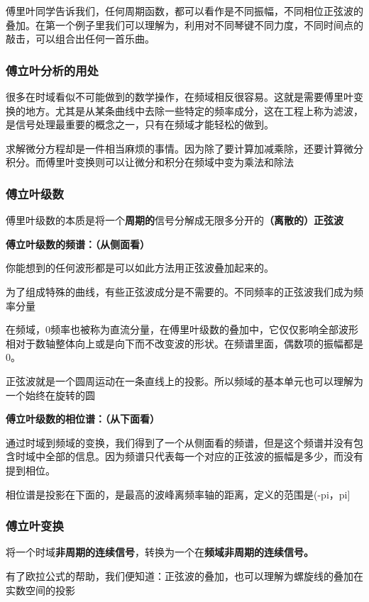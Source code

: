 \documentclass[UTF8]{ctexart}
\begin{document}
傅里叶同学告诉我们，任何周期函数，都可以看作是不同振幅，不同相位正弦波的叠加。在第一个例子里我们可以理解为，利用对不同琴键不同力度，不同时间点的敲击，可以组合出任何一首乐曲。

\subsubsection*{傅立叶分析的用处}

很多在时域看似不可能做到的数学操作，在频域相反很容易。这就是需要傅里叶变换的地方。尤其是从某条曲线中去除一些特定的频率成分，这在工程上称为滤波，是信号处理最重要的概念之一，只有在频域才能轻松的做到。

求解微分方程却是一件相当麻烦的事情。因为除了要计算加减乘除，还要计算微分积分。而傅里叶变换则可以让微分和积分在频域中变为乘法和除法

\subsubsection*{傅立叶级数}
傅里叶级数的本质是将一个\textbf{周期的}信号分解成无限多分开的\textbf{（离散的）正弦波}

\textbf{傅立叶级数的频谱：（从侧面看）}

你能想到的任何波形都是可以如此方法用正弦波叠加起来的。

为了组成特殊的曲线，有些正弦波成分是不需要的。不同频率的正弦波我们成为频率分量

在频域，0频率也被称为直流分量，在傅里叶级数的叠加中，它仅仅影响全部波形相对于数轴整体向上或是向下而不改变波的形状。在频谱里面，偶数项的振幅都是0。

正弦波就是一个圆周运动在一条直线上的投影。所以频域的基本单元也可以理解为一个始终在旋转的圆

\textbf{傅立叶级数的相位谱：（从下面看）}

通过时域到频域的变换，我们得到了一个从侧面看的频谱，但是这个频谱并没有包含时域中全部的信息。因为频谱只代表每一个对应的正弦波的振幅是多少，而没有提到相位。

相位谱是投影在下面的，是最高的波峰离频率轴的距离，定义的范围是(-pi，pi]

\subsubsection*{傅立叶变换}
将一个时域\textbf{非周期的连续信号}，转换为一个在\textbf{频域非周期的连续信号。}

有了欧拉公式的帮助，我们便知道：正弦波的叠加，也可以理解为螺旋线的叠加在实数空间的投影
\end{document}
